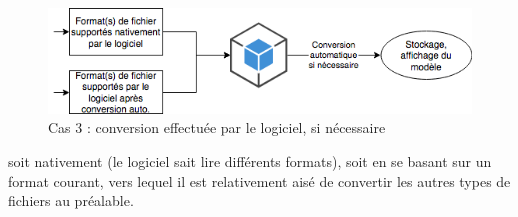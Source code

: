 \begin{figure}
    \centering
    \includegraphics[width=\linewidth]{Figures/file-importation-process-auto-conversion.png}
    \caption{Cas 3 : conversion effectuée par le logiciel, si nécessaire}
    \label{fig:file-importation-process-auto-conversion}
\end{figure}


soit nativement (le logiciel sait lire différents formats), soit en se basant sur un format courant, vers lequel il est relativement aisé de convertir les autres types de fichiers au préalable.

